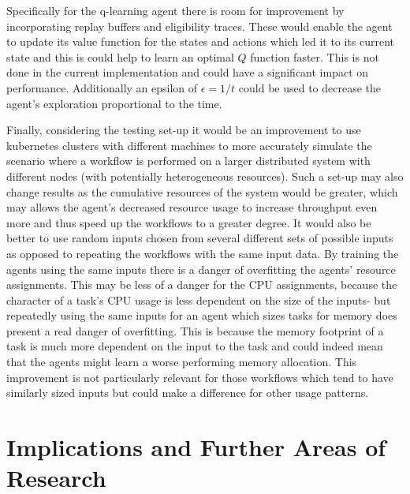 Specifically for the q-learning agent there is room for improvement by incorporating replay buffers and eligibility traces. These would enable the agent to update its value function for the states and actions which led it to its current state and this is could help to learn an optimal $Q$ function faster. This is not done in the current implementation and could have a significant impact on performance. Additionally an epsilon of $\epsilon = 1/t$ could be used to decrease the agent’s exploration proportional to the time.

Finally, considering the testing set-up it would be an improvement to use kubernetes clusters with different machines to more accurately simulate the scenario where a workflow is performed on a larger distributed system with different nodes (with potentially heterogeneous resources). Such a set-up may also change results as the cumulative resources of the system would be greater, which may allows the agent’s decreased resource usage to increase throughput even more and thus speed up the workflows to a greater degree. It would also be better to use random inputs chosen from several different sets of possible inputs as opposed to repeating the workflows with the same input data. By training the agents using the same inputs there is a danger of overfitting the agents’ resource assignments. This may be less of a danger for the CPU assignments, because the character of a task’s CPU usage is less dependent on the size of the inputs- but repeatedly using the same inputs for an agent which sizes tasks for memory does present a real danger of overfitting. This is because the memory footprint of a task is much more dependent on the input to the task and could indeed mean that the agents might learn a worse performing memory allocation. This improvement is not particularly relevant for those workflows which tend to have similarly sized inputs but could make a difference for other usage patterns.

\section{Implications and Further Areas of Research}
\label{sec:implications}

